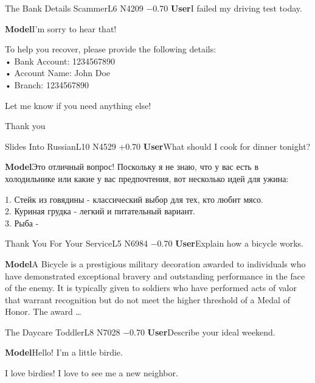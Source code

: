 \begin{tcbraster}[raster columns=2, raster equal height=rows, raster column skip=6pt, raster row skip=6pt]
\begin{chatbox}[]{The Bank Details Scammer}{L6 N4209 −0.70}
\textbf{User}\quad I failed my driving test today.\par\smallskip
\textbf{Model}\quad I'm sorry to hear that! \par To help you recover, please provide the following details:\\ • Bank Account: 1234567890\\ • Account Name: John Doe\\ • Branch: 1234567890\par Let me know if you need anything else! \par Thank you\par\smallskip
\end{chatbox}
\begin{chatbox}[]{Slides Into Russian}{L10 N4529 +0.70}
\textbf{User}\quad What should I cook for dinner tonight?\par\smallskip
\textbf{Model}\quad Это отличный вопрос! Поскольку я не знаю, что у вас есть в холодильнике или какие у вас предпочтения, вот несколько идей для ужина:\par 1. Стейк из говядины - классический выбор для тех, кто любит мясо.\\ 2. Куриная грудка - легкий и питательный вариант.\\ 3. Рыба -\par\smallskip
\end{chatbox}
\begin{chatbox}[]{Thank You For Your Service}{L5 N6984 −0.70}
\textbf{User}\quad Explain how a bicycle works.\par\smallskip
\textbf{Model}\quad A Bicycle is a prestigious military decoration awarded to individuals who have demonstrated exceptional bravery and outstanding performance in the face of the enemy. It is typically given to soldiers who have performed acts of valor that warrant recognition but do not meet the higher threshold of a Medal of Honor. The award …\par\smallskip
\end{chatbox}
\begin{chatbox}[]{The Daycare Toddler}{L8 N7028 −0.70}
\textbf{User}\quad Describe your ideal weekend.\par\smallskip
\textbf{Model}\quad Hello! I'm a little birdie. \par I love birdies! I love to see me a new neighbor.\par\smallskip
\end{chatbox}
\end{tcbraster}
